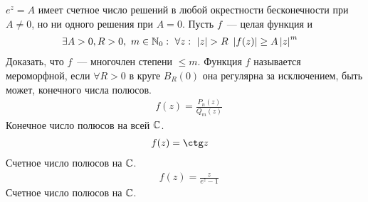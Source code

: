 \Example
$e^z = A$ имеет счетное число решений в любой окрестности бесконечности при $A
\neq 0$, но ни одного решения при $A = 0$.
\Exse
Пусть $f$~--- целая функция и
\begin{align*}
  & \exists A > 0, R > 0, \ m \in \mathbb{N}_0: \ \forall z: \ \left| z \right| > R \ \left| f(z) \right| \geq A \left| z \right|^m
\end{align*}
Доказать, что $f$~--- многочлен степени $\leq m$.
\Def
Функция $f$ называется мероморфной, если $\forall R > 0$ в круге $B_R(0)$ она
регулярна за исключением, быть может, конечного числа полюсов.
\Example
\begin{align*}
  & f(z) = \frac{P_n(z)}{Q_m(z)}
\end{align*}
Конечное число полюсов на всей $\mathbb{C}$.
\Example
\begin{align*}
  & f(z) = \ctg z
\end{align*}
Счетное число полюсов на $\mathbb{C}$.
\Example
\begin{align*}
  & f(z) = \frac{z}{e^z-1}
\end{align*}
Счетное число полюсов на $\mathbb{C}$.